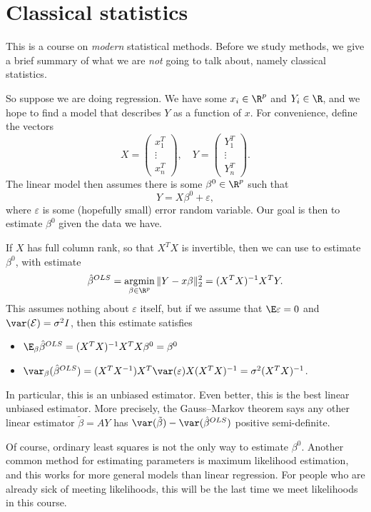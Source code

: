 \documentclass[a4paper]{article}
\DeclareMathOperator*\argmin{argmin}
\begin{document}
\section{Classical statistics}
This is a course on \emph{modern} statistical methods. Before we study methods, we give a brief summary of what we are \emph{not} going to talk about, namely classical statistics.

So suppose we are doing regression. We have some  $x_i \in \R^p$ and  $Y_i \in \R$, and we hope to find a model that describes $Y$ as a function of $x$. For convenience, define the vectors
\[
  X = \begin{pmatrix} x_1^T \\ \vdots \\ x_n^T\end{pmatrix},\quad
  Y = \begin{pmatrix} Y_1^T \\ \vdots \\ Y_n^T\end{pmatrix}.
\]
The linear model then assumes there is some $\beta^0 \in \R^p$ such that
\[
  Y = X \beta^0 + \varepsilon,
\]
where $\varepsilon$ is some (hopefully small) error random variable. Our goal is then to estimate $\beta^0$ given the data we have.

If $X$ has full column rank, so that $X^TX$ is invertible, then we can use  to estimate $\beta^0$, with estimate
\[
  \hat{\beta}^{OLS} = \argmin_{\beta \in \R^p} \|Y - x \beta\|_2^2 = (X^TX)^{-1} X^TY.
\]
This assumes nothing about $\varepsilon$ itself, but if we assume that $\E \varepsilon = 0$ and $\var (\mathcal{E}) = \sigma^2 I$, then this estimate satisfies
\begin{itemize}
  \item $\E_\beta \hat{\beta}^{OLS} = (X^T X)^{-1} X^T X \beta^0 = \beta^0$
  \item $\var_\beta(\hat{\beta}^{OLS}) = (X^T X^{-1}) X^T \var(\varepsilon) X (X^T X)^{-1} = \sigma^2 (X^T X)^{-1}$.
\end{itemize}
In particular, this is an unbiased estimator. Even better, this is the best linear unbiased estimator. More precisely, the Gauss--Markov theorem says any other linear estimator $\tilde{\beta} = AY$ has $\var(\tilde{\beta}) - \var(\hat{\beta}^{OLS})$ positive semi-definite.

Of course, ordinary least squares is not the only way to estimate $\beta^0$. Another common method for estimating parameters is maximum likelihood estimation, and this works for more general models than linear regression. For people who are already sick of meeting likelihoods, this will be the last time we meet likelihoods in this course.
\end{document}
